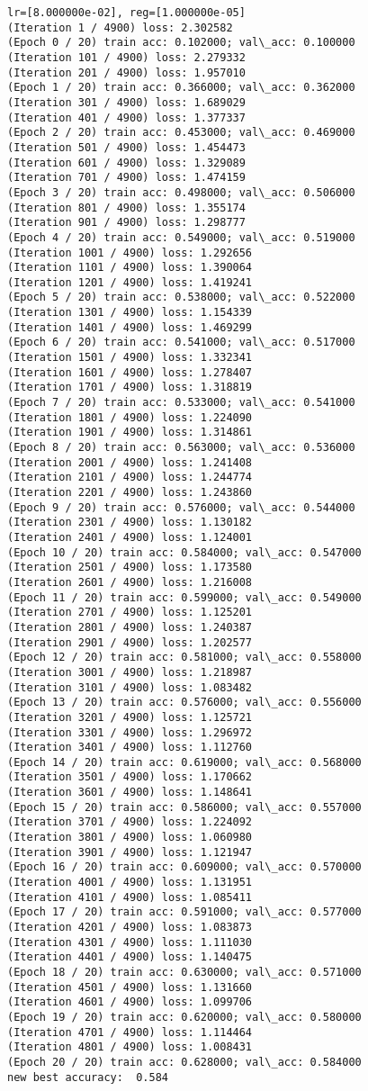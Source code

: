 \documentclass[11pt]{article}
\begin{document}
\begin{Verbatim}[commandchars=\\\{\}]
lr=[8.000000e-02], reg=[1.000000e-05]
(Iteration 1 / 4900) loss: 2.302582
(Epoch 0 / 20) train acc: 0.102000; val\_acc: 0.100000
(Iteration 101 / 4900) loss: 2.279332
(Iteration 201 / 4900) loss: 1.957010
(Epoch 1 / 20) train acc: 0.366000; val\_acc: 0.362000
(Iteration 301 / 4900) loss: 1.689029
(Iteration 401 / 4900) loss: 1.377337
(Epoch 2 / 20) train acc: 0.453000; val\_acc: 0.469000
(Iteration 501 / 4900) loss: 1.454473
(Iteration 601 / 4900) loss: 1.329089
(Iteration 701 / 4900) loss: 1.474159
(Epoch 3 / 20) train acc: 0.498000; val\_acc: 0.506000
(Iteration 801 / 4900) loss: 1.355174
(Iteration 901 / 4900) loss: 1.298777
(Epoch 4 / 20) train acc: 0.549000; val\_acc: 0.519000
(Iteration 1001 / 4900) loss: 1.292656
(Iteration 1101 / 4900) loss: 1.390064
(Iteration 1201 / 4900) loss: 1.419241
(Epoch 5 / 20) train acc: 0.538000; val\_acc: 0.522000
(Iteration 1301 / 4900) loss: 1.154339
(Iteration 1401 / 4900) loss: 1.469299
(Epoch 6 / 20) train acc: 0.541000; val\_acc: 0.517000
(Iteration 1501 / 4900) loss: 1.332341
(Iteration 1601 / 4900) loss: 1.278407
(Iteration 1701 / 4900) loss: 1.318819
(Epoch 7 / 20) train acc: 0.533000; val\_acc: 0.541000
(Iteration 1801 / 4900) loss: 1.224090
(Iteration 1901 / 4900) loss: 1.314861
(Epoch 8 / 20) train acc: 0.563000; val\_acc: 0.536000
(Iteration 2001 / 4900) loss: 1.241408
(Iteration 2101 / 4900) loss: 1.244774
(Iteration 2201 / 4900) loss: 1.243860
(Epoch 9 / 20) train acc: 0.576000; val\_acc: 0.544000
(Iteration 2301 / 4900) loss: 1.130182
(Iteration 2401 / 4900) loss: 1.124001
(Epoch 10 / 20) train acc: 0.584000; val\_acc: 0.547000
(Iteration 2501 / 4900) loss: 1.173580
(Iteration 2601 / 4900) loss: 1.216008
(Epoch 11 / 20) train acc: 0.599000; val\_acc: 0.549000
(Iteration 2701 / 4900) loss: 1.125201
(Iteration 2801 / 4900) loss: 1.240387
(Iteration 2901 / 4900) loss: 1.202577
(Epoch 12 / 20) train acc: 0.581000; val\_acc: 0.558000
(Iteration 3001 / 4900) loss: 1.218987
(Iteration 3101 / 4900) loss: 1.083482
(Epoch 13 / 20) train acc: 0.576000; val\_acc: 0.556000
(Iteration 3201 / 4900) loss: 1.125721
(Iteration 3301 / 4900) loss: 1.296972
(Iteration 3401 / 4900) loss: 1.112760
(Epoch 14 / 20) train acc: 0.619000; val\_acc: 0.568000
(Iteration 3501 / 4900) loss: 1.170662
(Iteration 3601 / 4900) loss: 1.148641
(Epoch 15 / 20) train acc: 0.586000; val\_acc: 0.557000
(Iteration 3701 / 4900) loss: 1.224092
(Iteration 3801 / 4900) loss: 1.060980
(Iteration 3901 / 4900) loss: 1.121947
(Epoch 16 / 20) train acc: 0.609000; val\_acc: 0.570000
(Iteration 4001 / 4900) loss: 1.131951
(Iteration 4101 / 4900) loss: 1.085411
(Epoch 17 / 20) train acc: 0.591000; val\_acc: 0.577000
(Iteration 4201 / 4900) loss: 1.083873
(Iteration 4301 / 4900) loss: 1.111030
(Iteration 4401 / 4900) loss: 1.140475
(Epoch 18 / 20) train acc: 0.630000; val\_acc: 0.571000
(Iteration 4501 / 4900) loss: 1.131660
(Iteration 4601 / 4900) loss: 1.099706
(Epoch 19 / 20) train acc: 0.620000; val\_acc: 0.580000
(Iteration 4701 / 4900) loss: 1.114464
(Iteration 4801 / 4900) loss: 1.008431
(Epoch 20 / 20) train acc: 0.628000; val\_acc: 0.584000
new best accuracy:  0.584


\end{Verbatim}
\end{document}
